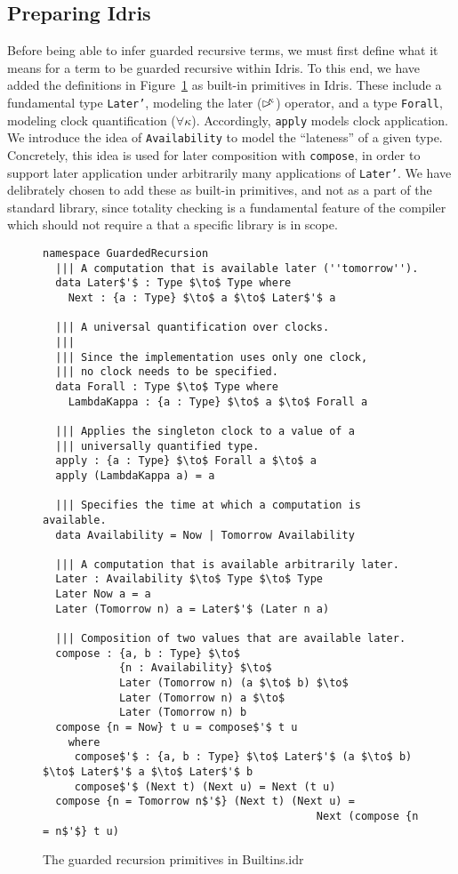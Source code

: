 \subsection{Preparing Idris}
Before being able to infer guarded recursive terms, we must first define what it
means for a term to be guarded recursive within Idris. To this end, we have
added the definitions in Figure~\ref{fig:guarded_recursion_primitives} as
built-in primitives in Idris. These include a fundamental type \texttt{Later'},
modeling the later ($\rhd^{\!\!\kappa}$) operator, and a type \texttt{Forall},
modeling clock quantification ($\forall\kappa$). Accordingly, \texttt{apply}
models clock application. We introduce the idea of \texttt{Availability} to
model the ``lateness'' of a given type. Concretely, this idea is used for later
composition with \texttt{compose}, in order to support later application under
arbitrarily many applications of \texttt{Later'}. We have delibrately chosen to
add these as built-in primitives, and not as a part of the standard library,
since totality checking is a fundamental feature of the compiler which should
not require a that a specific library is in scope.

\begin{figure}[h]
  \begin{lstlisting}[mathescape]
namespace GuardedRecursion
  ||| A computation that is available later (''tomorrow'').
  data Later$'$ : Type $\to$ Type where
    Next : {a : Type} $\to$ a $\to$ Later$'$ a

  ||| A universal quantification over clocks.
  |||
  ||| Since the implementation uses only one clock,
  ||| no clock needs to be specified.
  data Forall : Type $\to$ Type where
    LambdaKappa : {a : Type} $\to$ a $\to$ Forall a
 
  ||| Applies the singleton clock to a value of a
  ||| universally quantified type.
  apply : {a : Type} $\to$ Forall a $\to$ a
  apply (LambdaKappa a) = a 

  ||| Specifies the time at which a computation is available.
  data Availability = Now | Tomorrow Availability

  ||| A computation that is available arbitrarily later.
  Later : Availability $\to$ Type $\to$ Type
  Later Now a = a
  Later (Tomorrow n) a = Later$'$ (Later n a)
  
  ||| Composition of two values that are available later.                             
  compose : {a, b : Type} $\to$ 
            {n : Availability} $\to$ 
            Later (Tomorrow n) (a $\to$ b) $\to$ 
            Later (Tomorrow n) a $\to$ 
            Later (Tomorrow n) b
  compose {n = Now} t u = compose$'$ t u
    where
     compose$'$ : {a, b : Type} $\to$ Later$'$ (a $\to$ b) $\to$ Later$'$ a $\to$ Later$'$ b
     compose$'$ (Next t) (Next u) = Next (t u)
  compose {n = Tomorrow n$'$} (Next t) (Next u) = 
                                           Next (compose {n = n$'$} t u)
\end{lstlisting}
  \caption{The guarded recursion primitives in Builtins.idr}
  \label{fig:guarded_recursion_primitives}
\end{figure}


